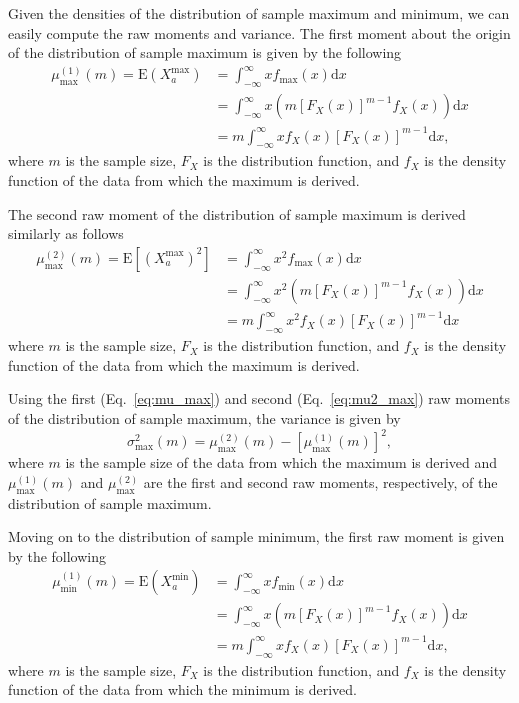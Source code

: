 \documentclass[aoas]{imsart}
\begin{document}
Given the densities of the distribution of sample maximum and minimum, we can easily compute the raw moments and variance. The first moment about the origin of the distribution of sample maximum is given by the following
%
\begin{equation}\label{eq:mu_max}
\begin{aligned}
\mu^{(1)}_\text{max}(m) = \text{E}(X^\text{max}_a) &= \int_{-\infty}^{\infty}x f_\text{max}(x)\text{d}x \\
&= \int_{-\infty}^{\infty}x \left(m [F_X(x)]^{m-1} f_X(x)\right)\text{d}x \\
&= m \int_{-\infty}^{\infty}x f_X(x) [F_X(x)]^{m-1}\text{d}x,
\end{aligned}
\end{equation}
%
where $m$ is the sample size, $F_X$ is the distribution function, and $f_X$ is the density function of the data from which the maximum is derived.

The second raw moment of the distribution of sample maximum is derived similarly as follows
%
\begin{equation}\label{eq:mu2_max}
\begin{aligned}
\mu^{(2)}_\text{max}(m) = \text{E}[(X^\text{max}_a)^2] &= \int_{-\infty}^{\infty}x^2 f_\text{max}(x)\text{d}x \\
&= \int_{-\infty}^{\infty}x^2 \left(m [F_X(x)]^{m-1} f_X(x)\right)\text{d}x \\
&= m \int_{-\infty}^{\infty}x^2 f_X(x) [F_X(x)]^{m-1}\text{d}x
\end{aligned}
\end{equation}
%
where $m$ is the sample size, $F_X$ is the distribution function, and $f_X$ is the density function of the data from which the maximum is derived.

Using the first (Eq.~\ref{eq:mu_max}) and second (Eq.~\ref{eq:mu2_max}) raw moments of the distribution of sample maximum, the variance is given by
\begin{equation}\label{eq:sig_max}
\sigma^2_\text{max}(m) = \mu^{(2)}_\text{max}(m) - \left[\mu^{(1)}_\text{max}(m)\right]^2,
\end{equation}
%
where $m$ is the sample size of the data from which the maximum is derived and $\mu^{(1)}_\text{max}(m)$ and $\mu^{(2)}_\text{max}$ are the first and second raw moments, respectively, of the distribution of sample maximum.

Moving on to the distribution of sample minimum, the first raw moment is given by the following
%
\begin{equation}\label{eq:mu_min}
\begin{aligned}
\mu^{(1)}_\text{min}(m) = \text{E}(X^\text{min}_a) &= \int_{-\infty}^{\infty}x f_\text{min}(x)\text{d}x \\
&= \int_{-\infty}^{\infty}x \left(m [F_X(x)]^{m-1} f_X(x)\right)\text{d}x \\
&= m \int_{-\infty}^{\infty}x f_X(x) [F_X(x)]^{m-1}\text{d}x,
\end{aligned}
\end{equation}
%
where $m$ is the sample size, $F_X$ is the distribution function, and $f_X$ is the density function of the data from which the minimum is derived.
\end{document}
